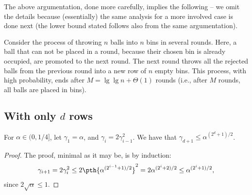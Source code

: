 The above argumentation, done more carefully, implies the following --
we omit the details because (essentially) the same analysis for a more
involved case is done next (the lower bound stated follows also from
the same argumentation).

\begin{theorem}
    Consider the process of throwing $n$ balls into $n$ bins in
    several rounds. Here, a ball that can not be placed in a round,
    because their chosen bin is already occupied, are promoted to the
    next round. The next round throws all the rejected balls from the
    previous round into a new row of $n$ empty bins.  This process,
    with high probability, ends after $M = \lg \lg n +\Theta(1)$
    rounds (i.e., after $M$ rounds, all balls are placed in bins).
\end{theorem}




\subsection{With only $d$ rows}


\begin{lemma}
    For $\alpha \in (0,1/4]$, let $\gamma_1 = \alpha$, and
    $\gamma_i = 2 \gamma_{i-1}^2$. We have that
    $\gamma_{d+1} \leq \alpha^{(2^{d} + 1)/2}$.
\end{lemma}
\begin{proof}
    The proof, minimal as it may be, is by induction:
    \begin{equation*}
        \gamma_{i+1}%
        =%
        2 \gamma_i^2 %
        \leq%
        2 \pth{\alpha^{(2^{i-1} + 1)/2}}^2
        =%
        2 \alpha^{(2^{i} + 2)/2}
        \leq%
        \alpha^{(2^{i} + 1)/2},
    \end{equation*}
    since $2\sqrt{\alpha} \leq 1$.
\end{proof}
    

